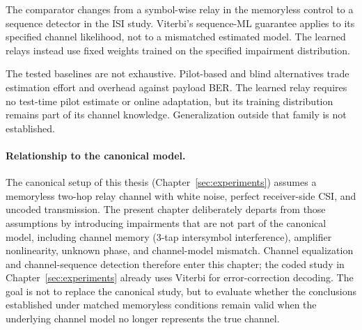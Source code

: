 The comparator changes from a symbol-wise relay in the memoryless control to a sequence detector in the ISI study. Viterbi's sequence-ML guarantee applies to its specified channel likelihood, not to a mismatched estimated model. The learned relays instead use fixed weights trained on the specified impairment distribution.

The tested baselines are not exhaustive. Pilot-based and blind alternatives trade estimation effort and overhead against payload BER. The learned relay requires no test-time pilot estimate or online adaptation, but its training distribution remains part of its channel knowledge. Generalization outside that family is not established.

\paragraph{Relationship to the canonical model.} The canonical setup of this thesis (Chapter~\ref{sec:experiments}) assumes a memoryless two-hop relay channel with white noise, perfect receiver-side CSI, and uncoded transmission. The present chapter deliberately departs from those assumptions by introducing impairments that are not part of the canonical model, including channel memory (3-tap intersymbol interference), amplifier nonlinearity, unknown phase, and channel-model mismatch. Channel equalization and channel-sequence detection therefore enter this chapter; the coded study in Chapter~\ref{sec:experiments} already uses Viterbi for error-correction decoding. The goal is not to replace the canonical study, but to evaluate whether the conclusions established under matched memoryless conditions remain valid when the underlying channel model no longer represents the true channel.

